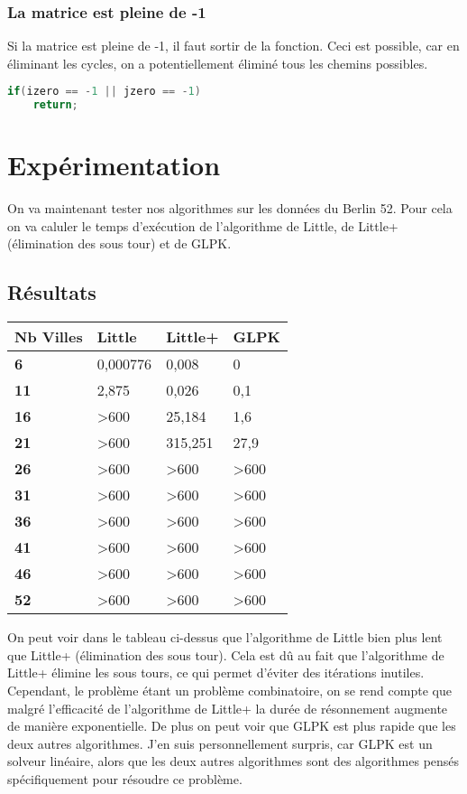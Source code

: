 \documentclass[11pt]{article}
\begin{document}
\subsubsection{La matrice est pleine de -1}

Si la matrice est pleine de -1, il faut sortir de la fonction. Ceci est possible, car en éliminant les cycles, on a potentiellement éliminé tous les chemins possibles.
\begin{lstlisting}[language=C]
if(izero == -1 || jzero == -1)
    return;
\end{lstlisting}

\section{Expérimentation}

On va maintenant tester nos algorithmes sur les données du Berlin 52. Pour cela on va caluler le temps d'exécution de l'algorithme de Little, de Little+ (élimination des sous tour) et de GLPK.

\subsection{Résultats}

\begin{table}[!ht]
    \centering
    \begin{tabular}{|l|l|l|l|}
    \hline
        \textbf{Nb Villes} & \textbf{Little} & \textbf{Little+} & \textbf{GLPK} \\ \hline
        \textbf{6} & 0,000776 & 0,008 & 0 \\ \hline
        \textbf{11} & 2,875 & 0,026 & 0,1 \\ \hline
        \textbf{16} & >600 & 25,184 & 1,6 \\ \hline
        \textbf{21} & >600 & 315,251 & 27,9 \\ \hline
        \textbf{26} & >600 & >600 & >600 \\ \hline
        \textbf{31} & >600 & >600 & >600 \\ \hline
        \textbf{36} & >600 & >600 & >600 \\ \hline
        \textbf{41} & >600 & >600 & >600 \\ \hline
        \textbf{46} & >600 & >600 & >600 \\ \hline
        \textbf{52} & >600 & >600 & >600 \\ \hline
    \end{tabular}
\end{table}

On peut voir dans le tableau ci-dessus que l'algorithme de Little bien plus lent que Little+ (élimination des sous tour). Cela est dû au fait que l'algorithme de Little+ élimine les sous tours, ce qui permet d'éviter des itérations inutiles.
Cependant, le problème étant un problème combinatoire, on se rend compte que malgré l'efficacité de l'algorithme de Little+ la durée de résonnement augmente de manière exponentielle.
De plus on peut voir que GLPK est plus rapide que les deux autres algorithmes. J'en suis personnellement surpris, car GLPK est un solveur linéaire, alors que les deux autres algorithmes sont des algorithmes pensés spécifiquement pour résoudre ce problème.
\end{document}
